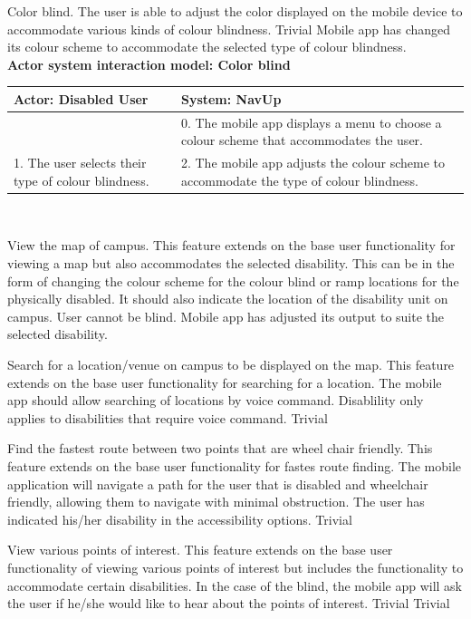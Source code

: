 \FuncReq
{Color blind.}
{The user is able to adjust the color displayed on the mobile device to accommodate various kinds of colour blindness.}
{Trivial}
{Mobile app has changed its colour scheme to accommodate the selected type of colour blindness.}
    \\
    \textbf{Actor system interaction model: Color blind}\\
    \begin{tabular}{ | p{6cm} | p{6cm} |}
    \hline
    Actor: Disabled User & System: NavUp \\ \hline
     & 0. The mobile app displays a menu to choose a colour scheme that accommodates the user.\\ \hline
    1. The user selects their type of colour blindness. & 2. The mobile app adjusts the colour scheme to accommodate the type of colour blindness.\\ \hline   
    \end{tabular}
\\
\bigskip

\FuncReq
{View the map of campus.}
{This feature extends on the base user functionality for viewing a map but also accommodates the selected disability. This can be in the form of changing the colour scheme for the colour blind or ramp locations for the physically disabled. It should also indicate the location of the disability unit on campus.}
{User cannot be blind.}
{Mobile app has adjusted its output to suite the selected disability.}

\FuncReq
{Search for a location/venue on campus to be displayed on the map.}
{This feature extends on the base user functionality for searching for a location. The mobile app should allow searching of locations by voice command.}
{Disablility only applies to disabilities that require voice command.}
{Trivial}

\FuncReq
{Find the fastest route between two points that are wheel chair friendly.}%
{This feature extends on the base user functionality for fastes route finding. The mobile application will navigate a path for the user that is disabled and wheelchair friendly, allowing them to navigate with minimal obstruction.}
{The user has indicated his/her disability in the accessibility options.}
{Trivial}

\FuncReq
{View various points of interest.}
{This feature extends on the base user functionality of viewing various points of interest but includes the functionality to accommodate certain disabilities. In the case of the blind, the mobile app will ask the user if he/she would like to hear about the points of interest.}
{Trivial}
{Trivial}

